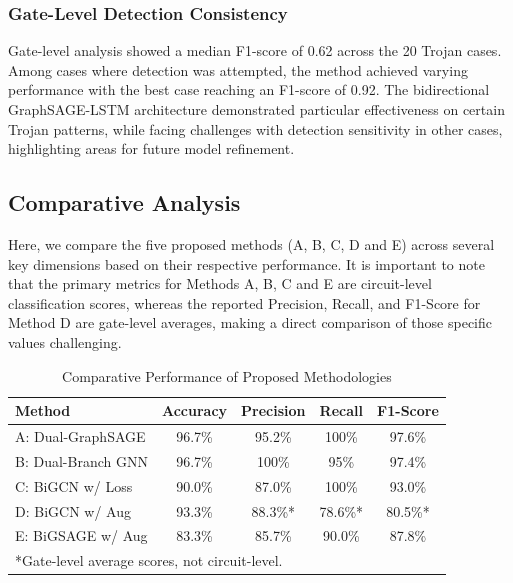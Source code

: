 \documentclass[conference]{IEEEtran}
\begin{document}
\subsubsection{Gate-Level Detection Consistency}
Gate-level analysis showed a median F1-score of 0.62 across the 20 Trojan cases. 
Among cases where detection was attempted, the method achieved varying performance with the best case reaching an F1-score of 0.92. The bidirectional GraphSAGE-LSTM architecture demonstrated particular effectiveness on certain Trojan patterns, while facing challenges with detection sensitivity in other cases, highlighting areas for future model refinement.


\subsection{Comparative Analysis}
\label{sec:comparative_analysis}
Here, we compare the five proposed methods (A, B, C, D and E) across several key dimensions based on their respective performance. It is important to note that the primary metrics for Methods A, B, C and E are circuit-level classification scores, whereas the reported Precision, Recall, and F1-Score for Method D are gate-level averages, making a direct comparison of those specific values challenging.

\begin{table}[h!]
    \centering
    \caption{Comparative Performance of Proposed Methodologies}
    \label{tab:comparative_results}
    \begin{tabular}{lcccc}
        \toprule
        \textbf{Method} & \textbf{Accuracy} & \textbf{Precision} & \textbf{Recall} & \textbf{F1-Score} \\
        \midrule
        A: Dual-GraphSAGE & 96.7\% & 95.2\% & 100\% & 97.6\% \\
        B: Dual-Branch GNN & 96.7\% & 100\% & 95\% & 97.4\% \\
        C: BiGCN w/ Loss & 90.0\% & 87.0\% & 100\% & 93.0\% \\
        D: BiGCN w/ Aug & 93.3\% & 88.3\%* & 78.6\%* & 80.5\%* \\
        E: BiGSAGE w/ Aug & 83.3\% & 85.7\% & 90.0\% & 87.8\% \\
        \bottomrule
        \multicolumn{5}{l}{\footnotesize{*Gate-level average scores, not circuit-level.}}
    \end{tabular}
\end{table}
\end{document}
